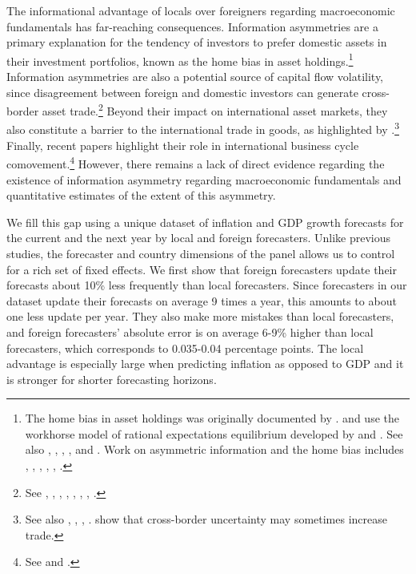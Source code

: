 
The informational advantage of locals over foreigners regarding macroeconomic fundamentals has far-reaching consequences. Information asymmetries are a primary explanation for the tendency of investors to prefer domestic assets in their investment portfolios, known as the home bias in asset holdings.\footnote{The home bias in asset holdings was originally documented by  \citet{FrenchPoterba1991}. \citet{Gehrig1993} and \citet{BrennanCao1997} use the workhorse model of rational expectations equilibrium developed by \citet{Grossman1976} and \citet{Admati1985}. See also \citet{Lewis1999}, \citet{TesarWerner1995}, \citet{Ahearneetal2004}, \citet{PortesRey2005}, \citet{CoeurdacierRey2013} and \citet{Hu2020}. Work on asymmetric information and the home bias includes \citet{Admati1985}, \citet{Pastor2000}, \citet{Portesetal2001}, \citet{VanNieuwerburghVeldkamp2009}, \citet{Mondria2010}, \citet{DeMarcoetal2021}.} Information asymmetries are also a potential source of capital flow volatility, since disagreement between foreign and domestic investors can generate cross-border asset trade.\footnote{See \citet{Yuan2005}, \citet{Albuquerqueetal2007}, \citet{Albuquerqueetal2009}, \citet{BrennanCao1997}, \citet{Broneretal2013}, \citet{TillevanWincoop2010}, \citet{TillevanWincoop2014}, \citet{BenhimaCordonier2022}.} Beyond their impact on international asset markets, they also constitute a barrier to the international trade in goods, as highlighted by \citet{AndersonvanWincoop2004}.\footnote{See also \citet{HeadMayer2013}, \citet{Allen2014}, \citet{DasguptaMondria2018}, \citet{Eatonetal2021}. \citet{Baleyetal2020} show that cross-border uncertainty may sometimes increase trade.} Finally, recent papers highlight their role in international business cycle comovement.\footnote{See \citet{Iliopulosetal2021} and \citet{Buietal2021}.} However, there remains a lack of direct evidence regarding the existence of information asymmetry regarding macroeconomic fundamentals and quantitative estimates of the extent of this asymmetry.

We fill this gap using a unique dataset of inflation and GDP growth forecasts for the current and the next year by local and foreign forecasters. Unlike previous studies, the forecaster and country dimensions of the panel allows us to control for a rich set of fixed effects. We first show that foreign forecasters update their forecasts about 10\% less frequently than local forecasters. Since forecasters in our dataset update their forecasts on average 9 times a year, this amounts to about one less update per year. They also make more mistakes than local forecasters, and foreign forecasters' absolute error is on average 6-9\% higher than local forecasters, which corresponds to 0.035-0.04 percentage points. The local advantage is especially large when predicting inflation as opposed to GDP and it is stronger for shorter forecasting horizons.

